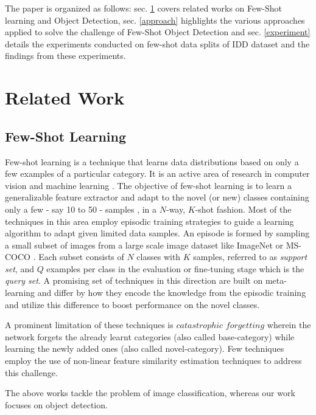 \documentclass[letterpaper]{article} %
\begin{document}
The paper is organized as follows: sec. \ref{related} covers related works on Few-Shot learning and Object Detection, sec. \ref{approach} highlights the various approaches applied to solve the challenge of Few-Shot Object Detection and sec. \ref{experiment} details the experiments conducted on few-shot data splits of IDD dataset and the findings from these experiments.

\section{Related Work}
\label{related}
\subsection{Few-Shot Learning}
\label{related:fscl}
Few-shot learning is a technique that learns data distributions based on only a few examples of a particular category. It is an active area of research in computer vision and machine learning \cite{closerfewshot}.
The objective of few-shot learning is to learn a generalizable feature extractor and adapt to the novel (or new) classes containing only a few - say 10 to 50 - samples \cite{protonet,matching-net}, in a $N$-way, $K$-shot fashion.
Most of the techniques in this area employ episodic training strategies \cite{local_desc,matching-net,protonet} to guide a learning algorithm to adapt given limited data samples.
An episode is formed by sampling a small subset of images from a large scale image dataset like ImageNet \cite{imagenet} or MS-COCO \cite{coco}. Each subset consists of $N$ classes with $K$ samples, referred to as \emph{support set}, and $Q$ examples per class in the evaluation or fine-tuning stage which is the \emph{query set}.
A  promising set of techniques in this direction are built on meta-learning \cite{maml,local_desc,relation-net,closerfewshot} and differ by how they encode the knowledge from the episodic training and utilize this difference to boost performance on the novel classes.

A prominent limitation of these techniques is $catastrophic$ $forgetting$ wherein the network forgets the already learnt categories (also called base-category) while learning the newly added ones (also called novel-category). Few techniques employ the use of non-linear feature similarity estimation techniques \cite{nonforget} to address this challenge.

The above works tackle the problem of image classification, whereas our work focuses on object detection.
\end{document}
